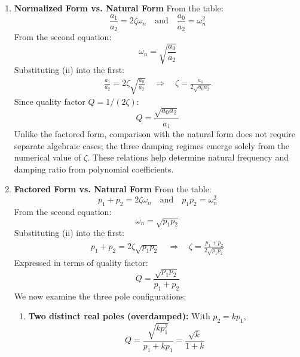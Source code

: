 \begin{enumerate}
\begin{enumerate}
\begin{align*}
          \frac{a_0}{a_2} &= \alpha^2 + \beta^2 \quad \Rightarrow \quad \alpha^2 + \beta^2 = \frac{a_0}{a_2} \tag{ii}
        \end{align*}
        Substituting (i) into (ii):
        \begin{align*}
          \left( \frac{a_1}{2a_2} \right)^2 + \beta^2 = \frac{a_0}{a_2}
          \quad \Rightarrow \quad
          \beta = \sqrt{\frac{a_0}{a_2} - \frac{a_1^2}{4a_2^2}}
        \end{align*}
    \end{enumerate}
    These relations help determine pole locations from
    polynomial coefficients and help in pole placement
    design (chose k to set pole separation).
  \item \textbf{Normalized Form vs. Natural Form}
    \noindent From the table:
    \[ \frac{a_1}{a_2} = 2\zeta\omega_n \quad \text{and} \quad \frac{a_0}{a_2} = \omega_n^2 \]
    From the second equation:
    \[ \omega_n = \sqrt{\frac{a_0}{a_2}} \tag{ii} \]
    Substituting (ii) into the first:
    \begin{align*}
    \frac{a_1}{a_2} = 2\zeta \sqrt{\frac{a_0}{a_2}}
    \quad \Rightarrow \quad
    \zeta = \frac{a_1}{2\sqrt{a_0 a_2}}
    \end{align*}
    Since quality factor \( Q = 1/(2\zeta) \):
    \[ Q = \frac{\sqrt{a_0 a_2}}{a_1} \]
    Unlike the factored form, comparison with the natural form does
    not require separate algebraic cases; the three damping regimes
    emerge solely from the numerical value of \(\zeta\). These
    relations help determine natural frequency and damping ratio from
    polynomial coefficients.
  \item \textbf{Factored Form vs. Natural Form}
    \noindent From the table:
    \[ p_1 + p_2 = 2\zeta\omega_n \quad \text{and} \quad p_1 p_2 = \omega_n^2 \]
    From the second equation:
    \[ \omega_n = \sqrt{p_1 p_2} \tag{ii} \]
    Substituting (ii) into the first:
    \begin{align*}
      p_1 + p_2 = 2\zeta \sqrt{p_1 p_2}
      \quad \Rightarrow \quad
      \zeta = \frac{p_1 + p_2}{2\sqrt{p_1 p_2}}
    \end{align*}
    Expressed in terms of quality factor:
    \[ Q = \frac{\sqrt{p_1 p_2}}{p_1 + p_2}\]
    We now examine the three pole configurations:
    \begin{enumerate}
      \item \textbf{Two distinct real poles (overdamped):} With \( p_2 = k p_1 \),
        \[ Q = \frac{\sqrt{k p_1^2}}{p_1 + k p_1} = \frac{\sqrt{k}}{1+k} \]

\end{enumerate}
\end{enumerate}
